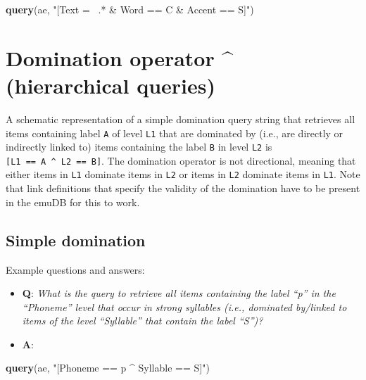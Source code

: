 \documentclass[]{book}
\newenvironment{Shaded}{\begin{snugshade}}{\end{snugshade}}
\newcommand{\KeywordTok}[1]{\textcolor[rgb]{0.13,0.29,0.53}{\textbf{#1}}}
\newcommand{\NormalTok}[1]{#1}
\newcommand{\StringTok}[1]{\textcolor[rgb]{0.31,0.60,0.02}{#1}}
\providecommand{\tightlist}{%
  \setlength{\itemsep}{0pt}\setlength{\parskip}{0pt}}
\theoremstyle{definition}
\theoremstyle{definition}
\theoremstyle{definition}
\theoremstyle{remark}
\begin{document}
\begin{Shaded}
\begin{Highlighting}[]
\KeywordTok{query}\NormalTok{(ae, }\StringTok{"[Text =~ .* & Word == C & Accent == S]"}\NormalTok{)}
\end{Highlighting}
\end{Shaded}

\hypertarget{domination-operator-hierarchical-queries}{%
\section{Domination operator \^{} (hierarchical
queries)}\label{domination-operator-hierarchical-queries}}

A schematic representation of a simple domination query string that
retrieves all items containing label \texttt{A} of level \texttt{L1}
that are dominated by (i.e., are directly or indirectly linked to) items
containing the label \texttt{B} in level \texttt{L2} is
\texttt{{[}L1\ ==\ A\ \^{}\ L2\ ==\ B{]}}. The domination operator is
not directional, meaning that either items in \texttt{L1} dominate items
in \texttt{L2} or items in \texttt{L2} dominate items in \texttt{L1}.
Note that link definitions that specify the validity of the domination
have to be present in the emuDB for this to work.

\hypertarget{simple-domination}{%
\subsection{Simple domination}\label{simple-domination}}

Example questions and answers:

\begin{itemize}
\tightlist
\item
  \textbf{Q}: \emph{What is the query to retrieve all items containing
  the label ``p'' in the ``Phoneme'' level that occur in strong
  syllables (i.e., dominated by/linked to items of the level
  ``Syllable'' that contain the label ``S'')?}
\item
  \textbf{A}:
\end{itemize}

\begin{Shaded}
\begin{Highlighting}[]
\KeywordTok{query}\NormalTok{(ae, }\StringTok{"[Phoneme == p ^ Syllable == S]"}\NormalTok{)}
\end{Highlighting}
\end{Shaded}
\end{document}
